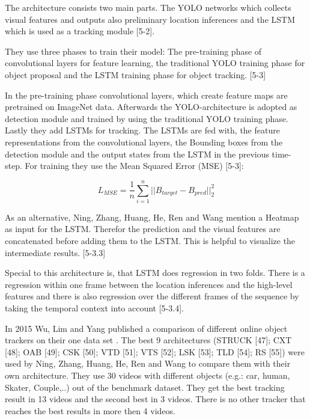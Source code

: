 \documentclass[conference]{IEEEtran}
\begin{document}
The architecture consists two main parts. The YOLO \cite{26} networks which collects visual features and outputs also preliminary location inferences and the LSTM which is used as a tracking module [5-2]. \newline 

They use three phases to train their model: The pre-training phase of  convolutional layers for feature learning, the traditional YOLO training phase for object proposal and the LSTM training phase for object tracking. [5-3]  \newline

In the pre-training phase convolutional layers, which create feature maps are pretrained on ImageNet data. Afterwards the YOLO-architecture is adopted as detection module and trained by using the traditional YOLO training phase. Lastly they add LSTMs for tracking. The LSTMs are fed with, the feature representations from the convolutional layers, the Bounding boxes from the detection module and the output states from the LSTM in the previous time-step. For training they use the Mean Squared Error (MSE) [5-3]: \newline

\[ L_{MSE} = \dfrac{1}{n} \sum_{i = 1}^n ||B_{target}-B_{pred}||_{2}^2 \] \newline

As an alternative, Ning, Zhang, Huang, He, Ren and Wang mention a Heatmap as  input for the LSTM. Therefor the prediction and the visual features are concatenated before adding them to the LSTM. This is helpful to visualize the intermediate results. [5-3.3] \newline

Special to this architecture is, that LSTM does regression in two folds. There is a regression within one frame between the location inferences and the high-level features and there is also regression over the different frames of the sequence by taking the temporal context into account [5-3.4].  \newline

In 2015 Wu, Lim and Yang published a comparison of different online object trackers on their one data set \cite{b28}. The best 9 architectures (STRUCK [47]; CXT [48]; OAB [49]; CSK [50]; VTD [51]; VTS [52]; LSK [53]; TLD [54]; RS [55]) were used by Ning, Zhang, Huang, He, Ren and Wang to compare them with their own architecture. They use 30 videos with different objects (e.g.: car, human, Skater, Couple,..) out of the benchmark \cite{b28} dataset. They get the best tracking result in 13 videos and the second best in 3 videos. There is no other tracker that reaches the best results in more then 4 videos. \newline
\end{document}

